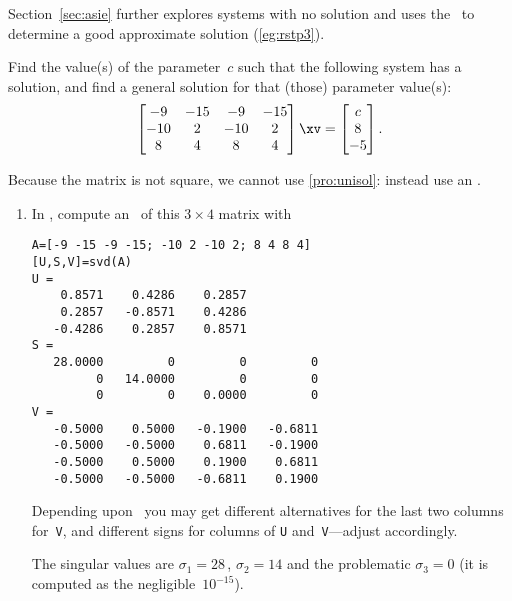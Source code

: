 Section~\ref{sec:asie} further explores systems with no solution and uses the \svd\ to determine a good approximate solution (\autoref{eg:rstp3}).



\begin{example} \label{eg:3x4findc}
Find the value(s) of the parameter~\(c\) such that the following system has a solution, and find a general solution for that (those) parameter value(s):
\begin{equation*}
\begin{bmatrix} -9&-15&-9&-15
\\-10&2&-10&2
\\8&4&8&4 \end{bmatrix}\xv=
\begin{bmatrix} c\\8\\-5 \end{bmatrix}.
\end{equation*}
\begin{solution} 
Because the matrix is not square, we cannot use \autoref{pro:unisol}: instead use an \svd.
\begin{enumerate}
\item In \script, compute an \svd\  of this \(3\times 4\) matrix with 
\setbox\ajrqrbox\hbox{}%
\marginpar{\usebox{\ajrqrbox\\[2ex]}}%
\begin{verbatim}
A=[-9 -15 -9 -15; -10 2 -10 2; 8 4 8 4]
[U,S,V]=svd(A)
U =
    0.8571    0.4286    0.2857
    0.2857   -0.8571    0.4286
   -0.4286    0.2857    0.8571
S =
   28.0000         0         0         0
         0   14.0000         0         0
         0         0    0.0000         0
V =
   -0.5000    0.5000   -0.1900   -0.6811
   -0.5000   -0.5000    0.6811   -0.1900
   -0.5000    0.5000    0.1900    0.6811
   -0.5000   -0.5000   -0.6811    0.1900
\end{verbatim}
\begin{aside}
Depending upon \script\ you may get different alternatives for the last two columns for~\texttt{V}, and different signs for columns of \texttt{U} and~\texttt{V}---adjust accordingly.
\end{aside}%
The singular values are \(\sigma_1=28\)\,, \(\sigma_2=14\) and the problematic \(\sigma_3=0\) (it is computed as the negligible~\(10^{-15}\)).


\end{enumerate}
\end{solution}
\end{example}
